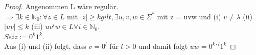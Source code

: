     \begin{proof}
      Angenommen L wäre regulär.\\
      \(\Rightarrow \exists k \in \mathbb{N}_0 : \forall z \in L\) mit \(|z| \geq k gilt, \exists u, v, w \in \Sigma^*\) mit z = uvw und (i) \(v \not = \lambda\) (ii) \(|uv| \leq k\) (iii) \(uv^i w \in L \forall i \in \mathbb{N}_0\). \\ \(Sei z:= 0^k 1^k\). \\Aus (i) und (ii) folgt, dass \(v = 0^l\) für \(l > 0\) und damit folgt \(uw = 0^{k\cdot l} 1^k\)
    \end{proof}
  
